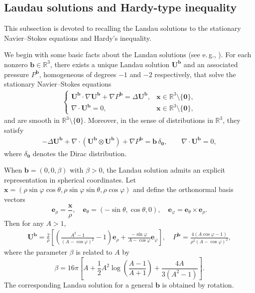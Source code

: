 \documentclass[10pt]{amsart}
\theoremstyle{plain}
\theoremstyle{definition}
\theoremstyle{remark}
\numberwithin{equation}{section}
\newcommand{\R}{\mathbb{R}}
\newcommand{\bx}{\boldsymbol{x}}
\newcommand{\bb}{{\boldsymbol{b}}}
\newcommand{\be}{{\boldsymbol{e}}}
\newcommand{\bU}{{\boldsymbol{U}}}
\begin{document}
\subsection{Laudau solutions and Hardy-type inequality}
\label{ssec:existence}

This subsection is devoted to recalling the Landau solutions to the stationary Navier--Stokes equations and Hardy's inequality.

We begin with some basic facts about the Landau solutions (see e.\,g., \cite[Section 8.2]{Tsai2018}). For each nonzero $\bb \in \mathbb{R}^3$, there exists a unique Landau solution $\bU^\bb$ and an associated pressure $P^\bb$, homogeneous of degrees $-1$ and $-2$ respectively, that solve the stationary Navier--Stokes equations
\begin{align}\label{eq:NS}
\begin{cases}
\bU^\bb \cdot \nabla \bU^\bb + \nabla P^\bb = \Delta \bU^\bb, & \bx \in \R^3\setminus \{\mathbf0\}, \\
\nabla \cdot \bU^\bb = 0, & \bx \in \R^3\setminus \{\mathbf0\},
\end{cases}
\end{align}
and are smooth in $\mathbb{R}^3 \setminus \{\mathbf0\}$. Moreover, in the sense of distributions in $\mathbb{R}^3$, they satisfy
\begin{align*}
-\Delta \bU^\bb + \nabla \cdot (\bU^\bb \otimes \bU^\bb) + \nabla P^\bb = \bb \, \delta_{\mathbf{0}}, \qquad 
\nabla \cdot  \bU^\bb = 0,
\end{align*}
where $\delta_{\mathbf{0}}$ denotes the Dirac distribution.

When $\bb = (0,0,\beta)$ with $\beta>0$, the Landau solution admits an explicit representation in spherical coordinates. Let $\bx = (\rho\sin\varphi\cos\theta,\rho\sin\varphi\sin\theta, \rho\cos\varphi)$ and define the orthonormal basis vectors
\[
\be_{\rho}=\frac{\bx}{\rho}, \quad \be_{\theta}=(-\sin\theta, \cos\theta,0), \quad \be_{\varphi}=\be_{\theta}\times \be_{\rho}.
\]
Then for any $A>1$,
\begin{align}\label{eqn:Landausolution}
    \bU^\bb =\frac{2}{\rho} 
    \left[
    \left(\frac{A^2-1}{(A-\cos\varphi)^2}-1\right)\be_{\rho}
    +\frac{-\sin\varphi}{A-\cos\varphi}\be_{\varphi}
    \right], \quad
    P^\bb =\frac{4(A \cos\varphi-1)}{\rho^2 (A-\cos\varphi)^2},
\end{align}
where the parameter $\beta$ is related to $A$ by
\[
\beta = 16 \pi 
\left[A + \frac 12 A^2 \log \left(\frac {A-1}{A+1}\right) + \frac{4A}{3(A^2-1)}\right].
\]
The corresponding Landau solution for a general $\bb$ is obtained by rotation.
\end{document}
